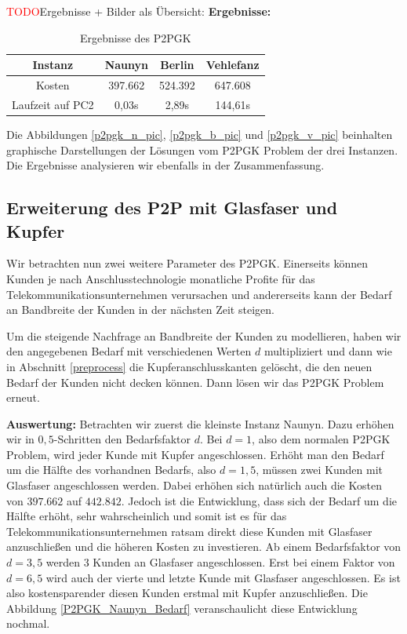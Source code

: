 \documentclass[11pt,a4paper]{article}
\newcommand{\TODO}{\textcolor{red}{TODO}}
\theoremstyle{my_th_style1}
\begin{document}
\TODO Ergebnisse + Bilder als Übersicht:
\textbf{Ergebnisse:} 
\begin{table}[h]
	\centering
	\begin{tabular}{c|c|c|c}
		Instanz & Naunyn & Berlin & Vehlefanz \\	
		\hline
		Kosten & 397.662 & 524.392 & 647.608 \\
		Laufzeit auf PC2 & 0,03s & 2,89s & 144,61s \\
	\end{tabular}
	\label{P2PGK}
	\caption{Ergebnisse des P2PGK} 
\end{table}

Die Abbildungen \eqref{p2pgk_n_pic}, \eqref{p2pgk_b_pic} und \eqref{p2pgk_v_pic} beinhalten graphische Darstellungen der L\"osungen vom P2PGK Problem der drei Instanzen.
Die Ergebnisse analysieren wir ebenfalls in der Zusammenfassung.

\subsection{Erweiterung des P2P mit Glasfaser und Kupfer}
\label{Erweiterung des P2PGK}
Wir betrachten nun zwei weitere Parameter des P2PGK.
Einerseits k\"onnen Kunden je nach Anschlusstechnologie monatliche Profite f\"ur das Telekommunikationsunternehmen verursachen und andererseits kann der Bedarf an Bandbreite der Kunden in der n\"achsten Zeit steigen.

Um die steigende Nachfrage an Bandbreite der Kunden zu modellieren, haben wir den angegebenen Bedarf mit verschiedenen Werten $d$ multipliziert und dann wie in Abschnitt \ref{preprocess} die Kupferanschlusskanten gelöscht, die den neuen Bedarf der Kunden nicht decken können.
Dann lösen wir das P2PGK Problem erneut. 

\textbf{Auswertung:}
Betrachten wir zuerst die kleinste Instanz Naunyn.
Dazu erhöhen wir in $0,5$-Schritten den Bedarfsfaktor $d$. Bei $d=1$, also dem normalen P2PGK Problem, wird jeder Kunde mit Kupfer angeschlossen. Erhöht man den Bedarf um die Hälfte des vorhandnen Bedarfs, also $d=1,5$, müssen zwei Kunden mit Glasfaser angeschlossen werden. Dabei erhöhen sich natürlich auch die Kosten von $397.662$ auf $442.842$.
Jedoch ist die Entwicklung, dass sich der Bedarf um die Hälfte erhöht, sehr wahrscheinlich und somit ist es f\"ur das Telekommunikationsunternehmen ratsam direkt diese Kunden mit Glasfaser anzuschließen und die höheren Kosten zu investieren.
Ab einem Bedarfsfaktor von $d=3,5$ werden 3 Kunden an Glasfaser angeschlossen.
Erst bei einem Faktor von $d=6,5$ wird auch der vierte und letzte Kunde mit Glasfaser angeschlossen. 
Es ist also kostensparender diesen Kunden erstmal mit Kupfer anzuschließen.
Die Abbildung \ref{P2PGK_Naunyn_Bedarf} veranschaulicht diese Entwicklung nochmal.
\end{document}
